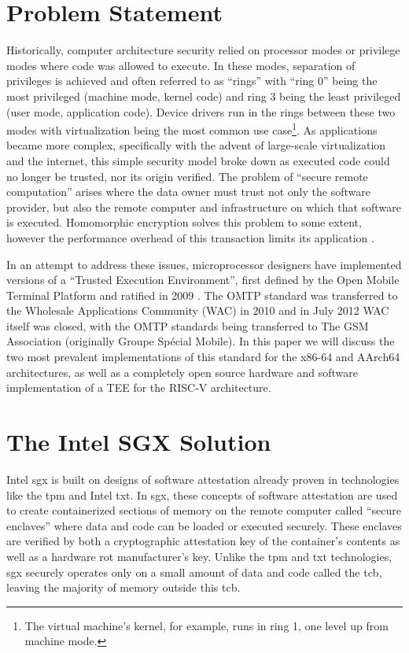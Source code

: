 \section{Problem Statement}
Historically, computer architecture security relied on processor modes or privilege modes where code was allowed to execute. In these modes, separation of privileges is achieved and often referred to as “rings” with “ring 0” being the most privileged (machine mode, kernel code) and ring 3 being the least privileged (user mode, application code). Device drivers run in the rings between these two modes with virtualization being the most common use case\footnote{The virtual machine’s kernel, for example, runs in ring 1, one level up from machine mode.}. As applications became more complex, specifically with the advent of large-scale virtualization and the internet, this simple security model broke down as executed code could no longer be trusted, nor its origin verified. The problem of “secure remote computation” arises where the data owner must trust not only the software provider, but also the remote computer and infrastructure on which that software is executed. Homomorphic encryption solves this problem to some extent, however the performance overhead of this transaction limits its application \cite{Gentry01}. 

In an attempt to address these issues, microprocessor designers have implemented versions of a “Trusted Execution Environment”, first defined by the Open Mobile Terminal Platform and ratified in 2009 \cite{OMTP01}. The OMTP standard was transferred to the Wholesale Applications Community (WAC) in 2010 and in July 2012 WAC itself was closed, with the OMTP standards being transferred to The GSM Association (originally Groupe Spécial Mobile)\cite{WAC}. In this paper we will discuss the two most prevalent implementations of this standard for the x86-64 and AArch64 architectures, as well as a completely open source hardware and software implementation of a TEE for the RISC-V architecture.
\section{The Intel SGX Solution}
Intel \gls{sgx} is built on designs of software attestation already proven in technologies like the \gls{tpm} and Intel \gls{txt}. In \gls{sgx}, these concepts of software attestation are used to create containerized sections of memory on the remote computer called “secure enclaves” where data and code can be loaded or executed securely. These enclaves are verified by both a cryptographic attestation key of the container’s contents as well as a hardware \gls{rot} manufacturer’s key. Unlike the \gls{tpm} and \gls{txt} technologies, \gls{sgx} securely operates only on a small amount of data and code called the \gls{tcb}, leaving the majority of memory outside this \gls{tcb}.
